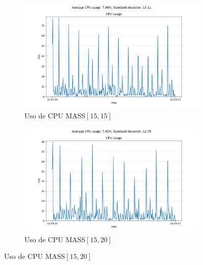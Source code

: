 \begin{figure}[H]
        \begin{subfigure}[b]{0.45\textwidth}
            \centering
            \includegraphics[width=\textwidth]{./imagenes/mtd-no-petition_u15_l15.csv.png}  
            \caption{Uso de CPU MASS$[15,15]$}
            \label{fig:imagen3}
        \end{subfigure}
        \hfill
        \begin{subfigure}[b]{0.45\textwidth}
            \centering
            \includegraphics[width=\textwidth]{./imagenes/mtd-no-petition_u20_l15.csv.png} 
            \caption{Uso de CPU MASS$[15,20]$}
            \label{fig:imagen4}
        \end{subfigure}

        \vspace{0.5cm} 


\end{figure}
